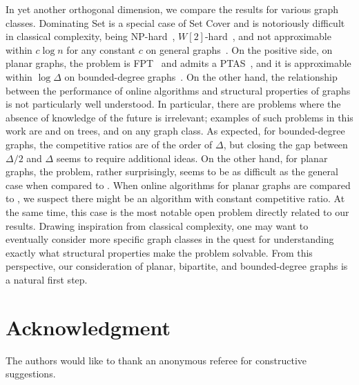 In yet another orthogonal dimension, we compare the results for 
various graph classes.
Dominating Set is a special case of Set Cover and is notoriously 
difficult in classical complexity,
being NP-hard~\cite{K72}, $W[2]$-hard~\cite{DF95}, and not
approximable within $c\log n$ for any constant $c$
on general graphs~\cite{F98}.
On the positive side, on planar graphs, the problem is FPT~\cite{ABFKN02}
and admits a PTAS~\cite{B94}, 
and it is approximable within $\log \Delta$
on bounded-degree graphs~\cite{CH79}.
On the other hand, the relationship between
the performance of online algorithms
and structural properties of graphs
is not particularly well understood.
In particular, there are problems where
the absence of knowledge of the future is irrelevant; examples of such problems
in this work are \cds and \tds on trees, and \ids on any graph class.
As expected, for bounded-degree graphs, the competitive ratios 
are of the order of $\Delta$,
but closing the gap between $\Delta/2$ and $\Delta$
seems to require additional ideas.
On the other hand, for planar graphs, the problem, rather surprisingly, 
seems to be as difficult as the general case when compared to \offopt. 
When online algorithms for planar graphs
are compared to \onopt, we suspect there might be
an algorithm with constant competitive ratio.
At the same time, this case is the most notable open problem directly related 
to our results. Drawing inspiration from classical complexity,
one may want to eventually consider more specific graph classes in the 
quest for understanding exactly what structural properties
make the problem solvable.
From this perspective, our consideration of planar, bipartite, and
bounded-degree graphs is a natural first step. 

\section*{Acknowledgment}
The authors would like to thank an anonymous referee for
constructive suggestions.





